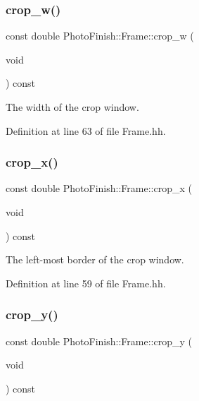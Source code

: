 \subsubsection{\texorpdfstring{crop\+\_\+w()}{crop\_w()}}
{\footnotesize\ttfamily const double Photo\+Finish\+::\+Frame\+::crop\+\_\+w (\begin{DoxyParamCaption}\item[{void}]{ }\end{DoxyParamCaption}) const\hspace{0.3cm}{\ttfamily [inline]}}



The width of the crop window. 



Definition at line 63 of file Frame.\+hh.

\mbox{\label{class_photo_finish_1_1_frame_af7fdd897762412a9d8dcfc309a0bd61a}} 
\subsubsection{\texorpdfstring{crop\+\_\+x()}{crop\_x()}}
{\footnotesize\ttfamily const double Photo\+Finish\+::\+Frame\+::crop\+\_\+x (\begin{DoxyParamCaption}\item[{void}]{ }\end{DoxyParamCaption}) const\hspace{0.3cm}{\ttfamily [inline]}}



The left-\/most border of the crop window. 



Definition at line 59 of file Frame.\+hh.

\mbox{\label{class_photo_finish_1_1_frame_afc570fbabb63837f104211f3102e70fd}} 
\subsubsection{\texorpdfstring{crop\+\_\+y()}{crop\_y()}}
{\footnotesize\ttfamily const double Photo\+Finish\+::\+Frame\+::crop\+\_\+y (\begin{DoxyParamCaption}\item[{void}]{ }\end{DoxyParamCaption}) const\hspace{0.3cm}{\ttfamily [inline]}}



